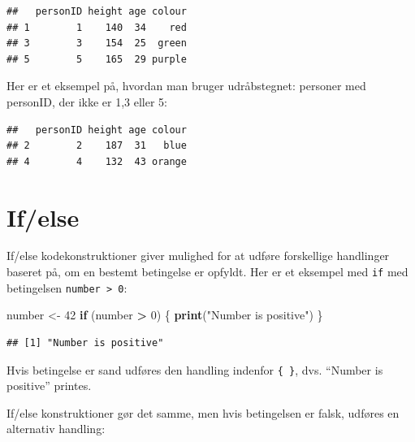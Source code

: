\documentclass[
]{book}
\newenvironment{Shaded}{\begin{snugshade}}{\end{snugshade}}
\newcommand{\CommentTok}[1]{\textcolor[rgb]{0.56,0.35,0.01}{\textit{#1}}}
\newcommand{\ControlFlowTok}[1]{\textcolor[rgb]{0.13,0.29,0.53}{\textbf{#1}}}
\newcommand{\DecValTok}[1]{\textcolor[rgb]{0.00,0.00,0.81}{#1}}
\newcommand{\FunctionTok}[1]{\textcolor[rgb]{0.13,0.29,0.53}{\textbf{#1}}}
\newcommand{\NormalTok}[1]{#1}
\newcommand{\OtherTok}[1]{\textcolor[rgb]{0.56,0.35,0.01}{#1}}
\newcommand{\SpecialCharTok}[1]{\textcolor[rgb]{0.81,0.36,0.00}{\textbf{#1}}}
\newcommand{\StringTok}[1]{\textcolor[rgb]{0.31,0.60,0.02}{#1}}
\theoremstyle{definition}
\theoremstyle{definition}
\theoremstyle{definition}
\theoremstyle{definition}
\theoremstyle{remark}
\begin{document}
\begin{verbatim}
##   personID height age colour
## 1        1    140  34    red
## 3        3    154  25  green
## 5        5    165  29 purple
\end{verbatim}

Her er et eksempel på, hvordan man bruger udråbstegnet: personer med personID, der ikke er 1,3 eller 5:

\begin{Shaded}
\end{Shaded}

\begin{verbatim}
##   personID height age colour
## 2        2    187  31   blue
## 4        4    132  43 orange
\end{verbatim}

\section{If/else}\label{ifelse}

If/else kodekonstruktioner giver mulighed for at udføre forskellige handlinger baseret på, om en bestemt betingelse er opfyldt. Her er et eksempel med \texttt{if} med betingelsen \texttt{number\ \textgreater{}\ 0}:

\begin{Shaded}
\begin{Highlighting}[]
\NormalTok{number }\OtherTok{\textless{}{-}} \DecValTok{42}
\ControlFlowTok{if}\NormalTok{ (number }\SpecialCharTok{\textgreater{}} \DecValTok{0}\NormalTok{) \{}
  \FunctionTok{print}\NormalTok{(}\StringTok{"Number is positive"}\NormalTok{)}
\NormalTok{\}}
\end{Highlighting}
\end{Shaded}

\begin{verbatim}
## [1] "Number is positive"
\end{verbatim}

Hvis betingelse er sand udføres den handling indenfor \texttt{\{\ \}}, dvs. ``Number is positive'' printes.

If/else konstruktioner gør det samme, men hvis betingelsen er falsk, udføres en alternativ handling:
\end{document}
